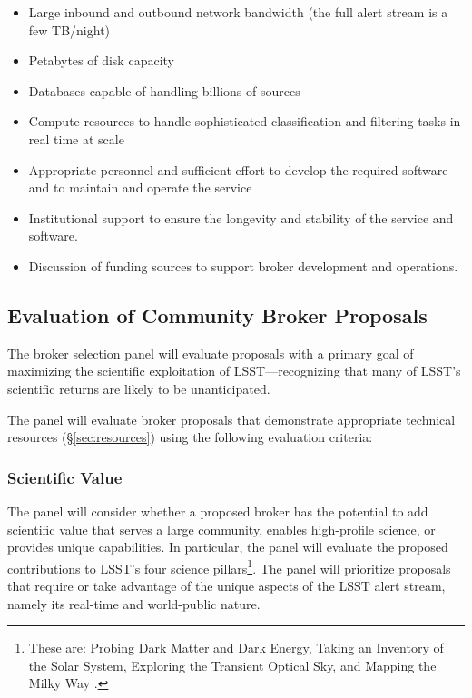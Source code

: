 \begin{itemize}
	\item Large inbound and outbound network bandwidth (the full alert stream is a few TB/night)
	\item Petabytes of disk capacity
	\item Databases capable of handling billions of sources
	\item Compute resources to handle sophisticated classification and filtering tasks in real time at scale
	\item Appropriate personnel and sufficient effort to develop the required software and to maintain and operate the service
	\item Institutional support to ensure the longevity and stability of the service and software.
	\item Discussion of funding sources to support broker development and operations.
\end{itemize}

\subsection{Evaluation of Community Broker Proposals} \label{sec:evaluation}

The broker selection panel will evaluate proposals with a primary goal of maximizing the scientific exploitation of LSST---recognizing that many of LSST's scientific returns are likely to be unanticipated.

The panel will evaluate broker proposals that demonstrate appropriate technical resources (\S \ref{sec:resources}) using the following evaluation criteria:

\subsubsection{Scientific Value}

The panel will consider whether a proposed broker has the potential to add scientific value that serves a large community, enables high-profile science, or provides unique capabilities.
In particular, the panel will evaluate the proposed contributions to LSST's four science pillars\footnote{These are: Probing Dark Matter and Dark Energy, Taking an Inventory of the Solar System, Exploring the Transient Optical Sky, and Mapping the Milky Way .}.
The panel will prioritize proposals that require or take advantage of the unique aspects of the LSST alert stream, namely its real-time and world-public nature.

